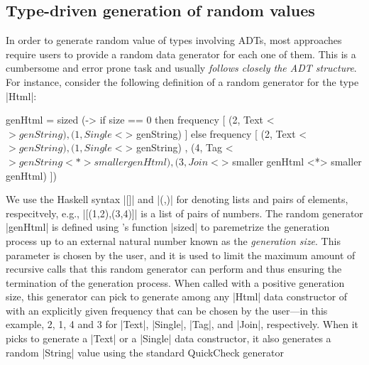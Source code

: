 

\subsection{Type-driven generation of random values}

In order to generate random value of types involving ADTs, most approaches
require users to provide a random data generator for each one of them.
%
This is a cumbersome and error prone task and usually \emph{follows closely the ADT
structure}.
%
For instance, consider the following definition of a \quickcheck random
generator for the type |Html|:
%
\begin{code}
genHtml = sized (\size ->
   if size == 0  then  frequency
                       [ (2,  Text    <$> genString)
                       , (1,  Single  <$> genString) ]
   else frequency
     [  (2,  Text    <$> genString)
     ,  (1,  Single  <$> genString)
     ,  (4,  Tag     <$> genString <*> smaller genHtml)
     ,  (3,  Join    <$> smaller genHtml <*> smaller genHtml) ])
\end{code} %
%
We use the Haskell syntax |[]| and |(,)| for denoting lists and pairs of
elements, respecitvely, e.g., |[(1,2),(3,4)]| is a list of pairs of numbers.
%
The random generator |genHtml| is defined using \quickcheck's function |sized|
to paremetrize the generation process up to an external natural number known as
the \emph{generation size}.
%
This parameter is chosen by the user, and it is used to limit the maximum amount
of recursive calls that this random generator can perform and thus ensuring
the termination of the generation process.
%
When called with a positive generation size, this generator can pick to generate
among any |Html| data constructor of with an explicitly given frequency that can
be chosen by the user---in this example, 2, 1, 4 and 3 for |Text|, |Single|,
|Tag|, and |Join|, respectively.
%
When it picks to generate a |Text| or a |Single| data constructor, it also
generates a random |String| value using the standard QuickCheck generator
